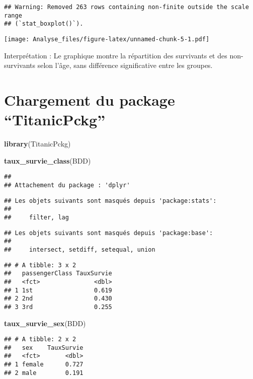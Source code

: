 \documentclass[
]{article}
\newenvironment{Shaded}{\begin{snugshade}}{\end{snugshade}}
\newcommand{\FunctionTok}[1]{\textcolor[rgb]{0.13,0.29,0.53}{\textbf{#1}}}
\newcommand{\NormalTok}[1]{#1}
\begin{document}
\begin{verbatim}
## Warning: Removed 263 rows containing non-finite outside the scale range
## (`stat_boxplot()`).
\end{verbatim}

\texttt{[image: Analyse\_files/figure-latex/unnamed-chunk-5-1.pdf]}

Interprétation : Le graphique montre la répartition des survivants et
des non-survivants selon l'âge, sans différence significative entre les
groupes.

\section{Chargement du package
``TitanicPckg''}\label{chargement-du-package-titanicpckg}

\begin{Shaded}
\begin{Highlighting}[]
\FunctionTok{library}\NormalTok{(TitanicPckg)}

\FunctionTok{taux\_survie\_class}\NormalTok{(BDD)}
\end{Highlighting}
\end{Shaded}

\begin{verbatim}
## 
## Attachement du package : 'dplyr'
\end{verbatim}

\begin{verbatim}
## Les objets suivants sont masqués depuis 'package:stats':
## 
##     filter, lag
\end{verbatim}

\begin{verbatim}
## Les objets suivants sont masqués depuis 'package:base':
## 
##     intersect, setdiff, setequal, union
\end{verbatim}

\begin{verbatim}
## # A tibble: 3 x 2
##   passengerClass TauxSurvie
##   <fct>               <dbl>
## 1 1st                 0.619
## 2 2nd                 0.430
## 3 3rd                 0.255
\end{verbatim}

\begin{Shaded}
\begin{Highlighting}[]
\FunctionTok{taux\_survie\_sex}\NormalTok{(BDD)}
\end{Highlighting}
\end{Shaded}

\begin{verbatim}
## # A tibble: 2 x 2
##   sex    TauxSurvie
##   <fct>       <dbl>
## 1 female      0.727
## 2 male        0.191
\end{verbatim}
\end{document}
